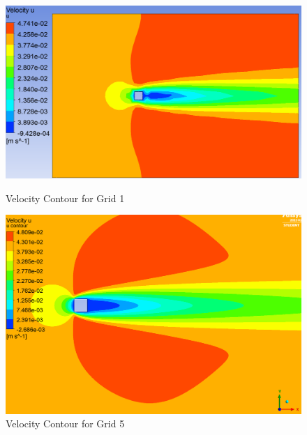 \begin{figure}[H]
    \centering
    \begin{minipage}{0.45\textwidth}
        \centering
        \includegraphics[width=\textwidth]{Questions/Figures/u velocity contour grid 1.png}
        \caption{Velocity Contour for Grid 1}
        \label{fig:velocity_contour_grid_1}
    \end{minipage}
    \begin{minipage}{0.45\textwidth}
        \centering
        \includegraphics[width=\textwidth]{Questions/Figures/u velocity contour grid 5.png}
        \caption{Velocity Contour for Grid 5}
        \label{fig:velocity_contour_grid_5}
    \end{minipage}
\end{figure}
